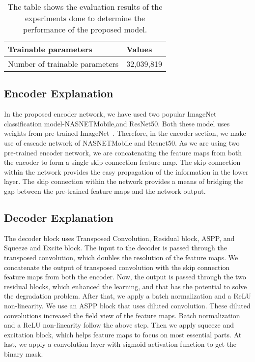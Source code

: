 \documentclass[conference]{IEEEtran}
\begin{document}
\begin{table}[]
\caption{The table shows the evaluation results of the experiments done to determine the performance of the proposed model.}
    \label{table:results}
    \def\arraystretch{1.5}
     \setlength\tabcolsep{10pt}
    \par\bigskip
    \centering
\begin{tabular}{|l|l|}
\hline
\textbf{Trainable parameters} & \textbf{Values} \\ \hline
Number of trainable parameters & 32,039,819 \\ \hline
\end{tabular}
\end{table}      
\subsection{Encoder Explanation}
In the proposed encoder network, we have used two popular ImageNet~\cite{deng2009imagenet} classification model-\ac{NASNETMobile},and ResNet50. Both these model uses weights from pre-trained ImageNet~\cite{deng2009imagenet}. Therefore, in the encoder section, we make use of cascade network of NASNETMobile and Resnet50. As we are using two pre-trained encoder network, we are concatenating the feature maps from both the encoder to form a single skip connection feature map. The skip connection within the network provides the easy propagation of the information in the lower layer. The skip connection within the network provides a means of bridging the gap between the pre-trained feature maps and the network output.

\subsection{Decoder Explanation}
The decoder block uses Transposed Convolution, Residual block, ASPP, and Squeeze and Excite block. The input to the decoder is passed through the transposed convolution, which doubles the resolution of the feature maps.  We concatenate the output of transposed convolution with the skip connection feature maps from both the encoder. Now, the output is passed through the two residual blocks, which enhanced the learning, and that has the potential to solve the degradation problem. After that, we apply a batch normalization and a ReLU non-linearity. We use an ASPP block that uses diluted convolution. These diluted convolutions increased the field view of the feature maps.  Batch normalization and a   ReLU non-linearity follow the above step. Then we apply squeeze and excitation block, which helps feature maps to focus on most essential parts. At last, we apply a convolution layer with sigmoid activation function to get the binary mask. 
\end{document}
